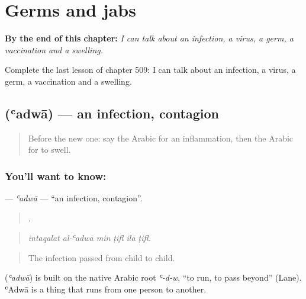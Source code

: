 
\chapter{Germs and jabs}
\label{ch:ar-germs-and-jabs}

\begin{chapteropening}
\textbf{By the end of this chapter:} \emph{I can talk about an infection, a virus, a germ, a vaccination and a swelling.}

Complete the last lesson of chapter 509: I can talk about an infection, a virus, a germ, a vaccination and a swelling.
\end{chapteropening}

\section[\texorpdfstring{\ar{عدوى} (ʿadwā)}{عدوى (ʿadwā)}]{ (ʿadwā) — an infection, contagion}

\label{lesson:AR-C509-adwa}



\begin{quote}
Before the new one: say the Arabic for an inflammation, then the Arabic for to swell.
\end{quote}

\subsection*{You'll want to know: }
\textbf{} — \emph{ʿadwā} — \textquotedblleft{}an infection, contagion\textquotedblright{}.

\begin{quote}
     .
\end{quote}

\begin{quote}
\emph{intaqalat al-ʿadwā min ṭifl ilā ṭifl.}
\end{quote}

\begin{quote}
The infection passed from child to child.
\end{quote}

\begin{cousinweb}
\textbf{} (\emph{ʿadwā}) is built on the native Arabic root \emph{ʿ-d-w}, \textquotedblleft{}to run, to pass beyond\textquotedblright{} (Lane). ʿAdwā is a thing that runs from one person to another.
\end{cousinweb}

